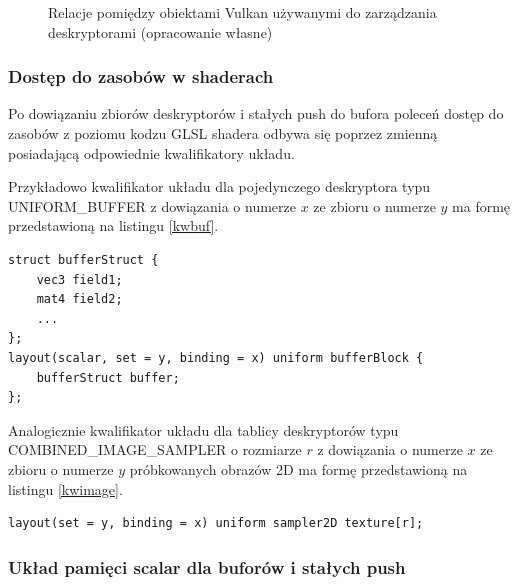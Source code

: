 \begin{figure}[H]
	\caption{Relacje pomiędzy obiektami Vulkan używanymi do zarządzania deskryptorami (opracowanie własne)}
	\label{descriptor_relations}
\end{figure}


\subsubsection{Dostęp do zasobów w shaderach}

Po dowiązaniu zbiorów deskryptorów i stałych push do bufora poleceń dostęp do zasobów z poziomu kodzu GLSL shadera odbywa się poprzez zmienną posiadającą odpowiednie kwalifikatory układu.

Przykładowo kwalifikator układu dla pojedynczego deskryptora typu UNIFORM\_BUFFER z dowiązania o numerze $x$ ze zbioru o numerze $y$ ma formę przedstawioną na listingu \ref{kwbuf}.
\lstset{language=GLSL}
\begin{lstlisting}[caption={Kwalifikator układu dla bufora uniform},captionpos=b,label={kwbuf}]
struct bufferStruct {
	vec3 field1;
	mat4 field2;
	...
};
layout(scalar, set = y, binding = x) uniform bufferBlock {
	bufferStruct buffer;
};
\end{lstlisting}

Analogicznie kwalifikator układu dla tablicy deskryptorów typu COMBINED\_IMAGE\_SAMPLER o rozmiarze $r$ z dowiązania o numerze $x$ ze zbioru o numerze $y$ próbkowanych obrazów 2D ma formę przedstawioną na listingu \ref{kwimage}.
\lstset{language=GLSL}
\begin{lstlisting}[caption={Kwalifikator układu dla tablicy tekstur},captionpos=b,label={kwimage}]
layout(set = y, binding = x) uniform sampler2D texture[r];
\end{lstlisting}


\subsubsection{Układ pamięci scalar dla buforów i stałych push}

